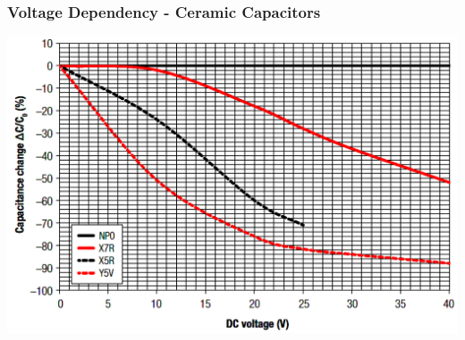 \documentclass{beamer}
\begin{document}
	\begin{frame}
    \frametitle{Voltage Dependency - Ceramic Capacitors}
		\begin{center}
			\includegraphics[scale=0.3]{obr11_napZav.png}
		\end{center}
  \end{frame}
\end{document}

